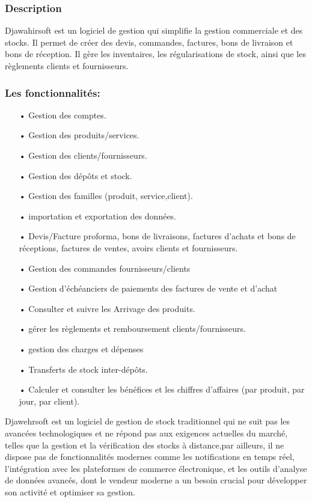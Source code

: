\documentclass[edit,12pt,a4paper,ChapStyle,oneside,doubleinterligne]{report}
\begin{document}
\subsubsection{Description}
Djawahirsoft est un logiciel de gestion qui simplifie la gestion commerciale et des stocks. Il permet de créer des devis, commandes, factures, bons de livraison et bons de réception. Il gère les inventaires, les régularisations de stock, ainsi que les règlements clients et fournisseurs.\cite{Djawahirsoft}\subsubsection{Les fonctionnalités:}
\begin{itemize}
    \item [•] Gestion des comptes. 
    \item [•] Gestion des produits/services.
    \item [•] Gestion des clients/fournisseurs.
    \item [•] Gestion des dépôts et stock.
    \item [•] Gestion des familles (produit, service,client).
    \item [•] importation et exportation des données.
    \item [•] Devis/Facture proforma, bons de livraisons, factures d'achats et bons de réceptions, factures de ventes, avoirs clients et fournisseurs.
    \item [•] Gestion des commandes fournisseurs/clients
    \item [•] Gestion d'échéanciers de paiements des factures de vente et d'achat
    \item [•] Consulter et suivre les Arrivage des produits.
    \item [•] gérer les règlements et remboursement clients/fournisseurs.
    \item [•] gestion des charges et dépenses
    \item [•] Transferts de stock inter-dépôts.
    \item [•] Calculer et consulter les bénéfices et les chiffres d'affaires (par produit, par jour, par client).
\end{itemize}
Djawehrsoft est un logiciel de gestion de stock traditionnel qui ne suit pas les avancées technologiques et ne répond pas aux exigences actuelles du marché, telles que la gestion et la vérification des stocks à distance,par ailleurs, il ne dispose pas de fonctionnalités modernes comme les notifications en temps réel, l'intégration avec les plateformes de commerce électronique, et les outils d'analyse de données avancés, dont le vendeur moderne a un besoin crucial pour développer son activité et optimiser sa gestion.
\end{document}
